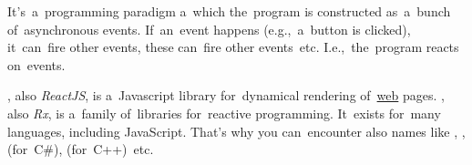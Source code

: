 It's~a~programming paradigm a~which the~program is constructed as~a~bunch of~asynchronous events.
If~an~event happens (e.g.,~a~button is clicked), it~can~fire other events, these can~fire other events~etc.
I.e.,~the~program reacts on~events.

\begin{itemize}
    , also \textit{ReactJS}, is a~Javascript library for~dynamical rendering of~\hyperref[internetweb]{web} pages.
    , also \textit{Rx}, is a~family of~libraries for~reactive programming.
            It~exists for~many languages, including JavaScript.
            That's why you can~encounter also names like , ,  \mbox{(for C\#)},  \mbox{(for C++) etc.}
\end{itemize}
